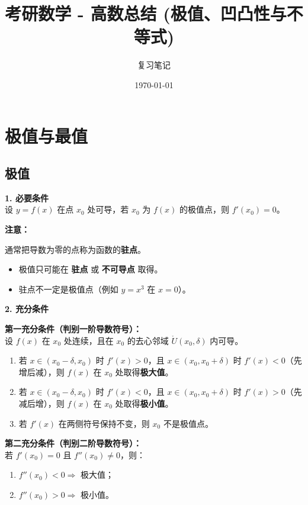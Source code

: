 \documentclass[a4paper,12pt]{ctexart}
\title{\textbf{考研数学 - 高数总结 (极值、凹凸性与不等式)}}
\author{复习笔记}
\date{\today}
\newenvironment{purplebox}
  {\begin{tcolorbox}[colback=white, colframe=boxpurple, boxrule=1pt, sharp corners, title=\textbf{定理/定义}]}
  {\end{tcolorbox}}
\newcommand{\zh}[1]{\par\smallskip\noindent\textbf{#1}\par\smallskip}
\begin{document}
\maketitle
\tableofcontents
\newpage

\section{极值与最值}

\subsection{极值}
\textbf{1. 必要条件} \\
设 $y = f(x)$ 在点 $x_0$ 处可导，若 $x_0$ 为 $f(x)$ 的极值点，则 $f'(x_0) = 0$。

\zh{注意：}
通常把导数为零的点称为函数的\textbf{驻点}。
\begin{itemize}
    \item 极值只可能在 \textbf{驻点} 或 \textbf{不可导点} 取得。
    \item 驻点不一定是极值点（例如 $y=x^3$ 在 $x=0$）。
\end{itemize}

\textbf{2. 充分条件}

\begin{purplebox}
\textbf{第一充分条件（判别一阶导数符号）：} \\
设 $f(x)$ 在 $x_0$ 处连续，且在 $x_0$ 的去心邻域 $\mathring{U}(x_0, \delta)$ 内可导。
\begin{enumerate}
    \item 若 $x \in (x_0-\delta, x_0)$ 时 $f'(x) > 0$，且 $x \in (x_0, x_0+\delta)$ 时 $f'(x) < 0$（先增后减），则 $f(x)$ 在 $x_0$ 处取得\textbf{极大值}。
    \item 若 $x \in (x_0-\delta, x_0)$ 时 $f'(x) < 0$，且 $x \in (x_0, x_0+\delta)$ 时 $f'(x) > 0$（先减后增），则 $f(x)$ 在 $x_0$ 处取得\textbf{极小值}。
    \item 若 $f'(x)$ 在两侧符号保持不变，则 $x_0$ 不是极值点。
\end{enumerate}
\end{purplebox}

\begin{purplebox}
\textbf{第二充分条件（判别二阶导数符号）：} \\
若 $f'(x_0) = 0$ 且 $f''(x_0) \neq 0$，则：
\begin{enumerate}
    \item $f''(x_0) < 0 \Rightarrow$ 极大值；
    \item $f''(x_0) > 0 \Rightarrow$ 极小值。
\end{enumerate}
\end{purplebox}
\end{document}
